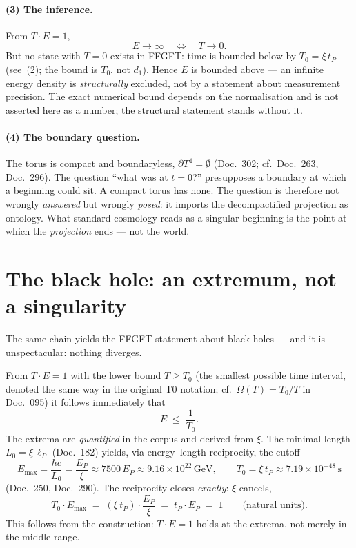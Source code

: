 \paragraph{(3) The inference.} From $T\cdot E = 1$,
\begin{equation}
E \to \infty \quad\Longleftrightarrow\quad T \to 0 .
\end{equation}
But no state with $T = 0$ exists in FFGFT: time is bounded below by
$T_0 = \xi\,t_P$ (see~(2); the bound is $T_0$, not $d_1$). Hence $E$ is bounded above --- an infinite energy density is \emph{structurally} excluded,
not by a statement about measurement precision. The exact numerical bound depends on the
normalisation and is not asserted here as a number; the structural statement stands without it.

\paragraph{(4) The boundary question.} The torus is compact and boundaryless,
$\partial T^4 = \emptyset$ (Doc.~302; cf.\ Doc.~263, Doc.~296). The question \enquote{what was at
$t=0$?} presupposes a boundary at which a beginning could sit. A compact torus has none. The
question is therefore not wrongly \emph{answered} but wrongly \emph{posed}: it imports the
decompactified projection as ontology. What standard cosmology reads as a singular beginning is
the point at which the \emph{projection} ends --- not the world.

\section{The black hole: an extremum, not a singularity}

The same chain yields the FFGFT statement about black holes --- and it is
unspectacular: nothing diverges.

From $T\cdot E = 1$ with the lower bound $T \ge T_0$ (the smallest possible time interval, denoted
the same way in the original T0 notation; cf.\ $\Omega(T)=T_0/T$ in Doc.~095) it follows
immediately that
\begin{equation}
E \;\le\; \frac{1}{T_0}.
\end{equation}
The extrema are \emph{quantified} in the corpus and derived from $\xi$. The minimal length
$L_0 = \xi\,\ell_P$ (Doc.~182) yields, via energy--length reciprocity, the cutoff
\begin{equation}
E_\text{max} = \frac{\hbar c}{L_0} = \frac{E_P}{\xi} \approx 7500\,E_P \approx 9.16\times10^{22}\,\text{GeV},
\qquad
T_0 = \xi\, t_P \approx 7.19\times10^{-48}\,\text{s}
\end{equation}
(Doc.~250, Doc.~290). The reciprocity closes \emph{exactly}: $\xi$ cancels,
\begin{equation}
T_0 \cdot E_\text{max} \;=\; (\xi\, t_P)\cdot\frac{E_P}{\xi} \;=\; t_P \cdot E_P \;=\; 1
\qquad\text{(natural units)} .
\end{equation}
This follows from the construction: $T\cdot E = 1$ holds at the
extrema, not merely in the middle range.

